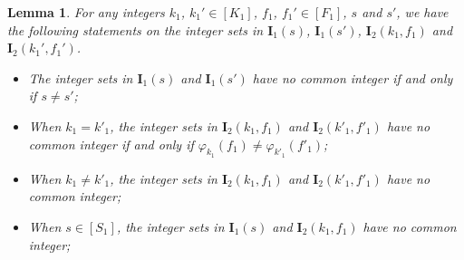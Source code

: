 \documentclass[onecolumn,10pt]{IEEEtran}
\theoremstyle{mythm}
\newtheorem{lemma}{Lemma}
\begin{document}
{\begin{itemize}
\begin{lemma}
\label{lem-integer-se-order}
For any integers $k_1$, $k_1'\in[K_1]$, $f_1$, $f_1'\in[F_1]$, $s$ and $s'$, we have the following statements on the integer sets in $\mathbf{I}_1(s)$, $\mathbf{I}_1(s')$, $\mathbf{I}_2(k_1,f_1)$ and $\mathbf{I}_2(k_1',f_1')$.
\begin{itemize}
\item %
    The integer sets in $\mathbf{I}_1(s)$ and $\mathbf{I}_1(s')$ have no common integer if and only if $s\neq s'$;
\item %
    When $k_1=k'_1$, the integer sets in $\mathbf{I}_2(k_1,f_1)$ and $\mathbf{I}_2(k'_1,f'_1)$ have no common integer if and only if $\varphi_{k_1}(f_1)\neq\varphi_{k'_1}(f'_1)$;
\item %
    When $k_1\neq k'_1$, the integer sets in $\mathbf{I}_2(k_1,f_1)$ and $\mathbf{I}_2(k'_1,f'_1)$ have no common integer;
\item %
    When $s\in[S_1]$, the integer sets in $\mathbf{I}_1(s)$ and $\mathbf{I}_2(k_1,f_1)$ have no common integer;
\end{itemize}

\end{lemma}
\end{itemize}}
\end{document}
